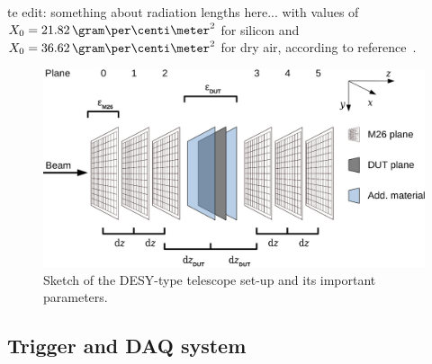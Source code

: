 te edit: something about radiation lengths here...
\label{sec:radiationlengths}
with values of $X_0 = 21.82\,\allowbreak\gram\per\centi\meter^2$ for silicon and $X_0 = 36.62\,\gram\per\centi\meter^2$ for dry air, according to reference~\cite{ref:x0values}.


\begin{figure}[tb]
	\center
	\includegraphics[width=.9\textwidth]{figures/sketch_tscope4}
	\caption[Sketch of the DESY-type telescope set-up]{Sketch of the DESY-type telescope set-up and its important parameters.}
	\label{fig:datura_sketch}
\end{figure}

\subsection{Trigger and DAQ system}

